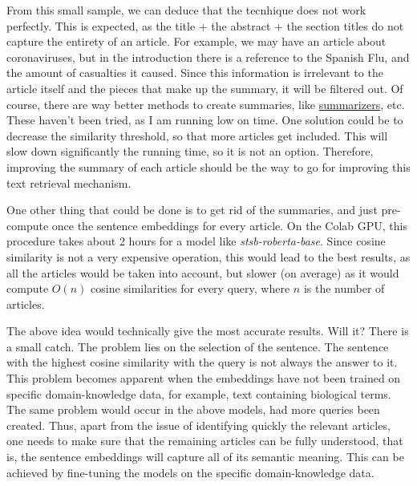 \documentclass[12pt]{report}
\begin{document}
\noindent From this small sample, we can deduce that the 
tecnhique does not work perfectly. This is expected, as the title + the
abstract + the section titles do not capture the entirety of an article. For example,
we may have an article about coronaviruses, but in the introduction there is a reference
to the Spanish Flu, and the amount of casualties it caused. Since this information is
irrelevant to the article itself and the pieces that make up the summary, it will be
filtered out. Of course, there are way better methods to create summaries, like
\href{https://huggingface.co/transformers/task_summary.html#summarization}{summarizers},
etc. These haven't been tried, as I am running low on time. One solution could be to
decrease the similarity threshold, so that more articles get included. This will slow down
significantly the running time, so it is not an option. Therefore, improving
the summary of each article should be the way to go for improving this text retrieval
mechanism. \bigskip

\noindent One other thing that could be done is to get rid of the summaries, and just
pre-compute once the sentence embeddings for every article. On the Colab GPU, this
procedure takes about 2 hours for a model like \textit{stsb-roberta-base}. Since
cosine similarity is not a very expensive operation, this would lead to the best results,
as all the articles would be taken into account, but slower (on average) as it would
compute $O(n)$ cosine similarities for every query, where $n$ is the number of articles.
\bigskip

\noindent The above idea would technically give the most accurate results. Will it?
There is a small catch. The problem lies on the selection of the 
sentence. The sentence with the highest cosine similarity with the query is not always
the answer to it. This problem becomes apparent when the embeddings have not been
trained on specific domain-knowledge data, for example, text containing biological terms.
The same problem would occur in the above models, had more queries been created.
Thus, apart from the issue of identifying quickly the relevant articles, one needs
to make sure that the remaining articles can be fully understood, that is, the
sentence embeddings will capture all of its semantic meaning. This can be achieved
by fine-tuning the models on the specific domain-knowledge data.
\end{document}
